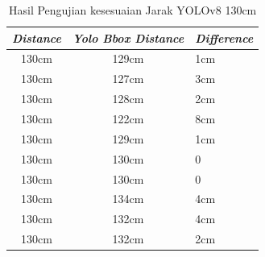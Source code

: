       \begin{table}[H]
        \centering
        \caption{Hasil Pengujian kesesuaian Jarak YOLOv8 130cm}
        \label{tb:pengukurankesusaian130cmv8}
        \begin{tabular}{|c|c|l|}
          \hline
          \textit{Distance} & \textit{Yolo Bbox Distance} & \textit{Difference} \\ \hline
          130cm             & 129cm                       & 1cm                 \\ \hline
          130cm             & 127cm                       & 3cm                 \\ \hline
          130cm             & 128cm                       & 2cm                 \\ \hline
          130cm             & 122cm                       & 8cm                 \\ \hline
          130cm             & 129cm                       & 1cm                 \\ \hline
          130cm             & 130cm                       & 0                   \\ \hline
          130cm             & 130cm                       & 0                   \\ \hline
          130cm             & 134cm                       & 4cm                 \\ \hline
          130cm             & 132cm                       & 4cm                 \\ \hline
          130cm             & 132cm                       & 2cm                 \\ \hline
          \end{tabular}
        \end{table}

    

